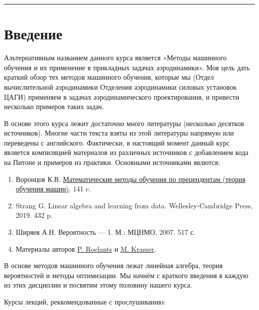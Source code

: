 \documentclass[11pt,a4paper]{article}
\renewcommand{\linethickness}{0.1ex}
\providecommand{\tightlist}{%
      \setlength{\itemsep}{0pt}\setlength{\parskip}{0pt}}
\begin{document}
    \begin{center}\rule{0.5\linewidth}{\linethickness}\end{center}

    \hypertarget{ux432ux432ux435ux434ux435ux43dux438ux435}{%
\section{Введение}\label{ux432ux432ux435ux434ux435ux43dux438ux435}}

Альтернативным названием данного курса является «Методы машинного
обучения и их применение в прикладных задачах аэродинамики». Моя цель
дать краткий обзор тех методов машинного обучения, которые мы (Отдел
вычислительной аэродинамики Отделения аэродинамики силовых установок
ЦАГИ) применяем в задачах аэродинамического проектирования, и привести
несколько примеров таких задач.

В основе этого курса лежит достаточно много литературы (несколько
десятков источников). Многие части текста взяты из этой литературы
напрямую или переведены с английского. Фактически, в настоящий момент
данный курс является компиляцией материалов из различных источников с
добавлением кода на Питоне и примеров из практики. Основными источниками
явлются:

\begin{enumerate}
\def\labelenumi{\arabic{enumi}.}
\tightlist
\item
  Воронцов К.В.
  \href{http://www.machinelearning.ru/wiki/images/6/6d/Voron-ML-1.pdf}{Математические
  методы обучения по прецендентам (теория обучения машин)}. 141 c.
\item
  Strang G. Linear algebra and learning from data. Wellesley-Cambridge
  Press, 2019. 432 p.
\item
  Ширяев А.Н. Вероятность --- 1. М.: МЦНМО, 2007. 517 с.
\item
  Материалы авторов \href{https://peterroelants.github.io/}{P. Roelants}
  и \href{http://krasserm.github.io/}{M. Krasser}.
\end{enumerate}

В основе методов машинного обучения лежат линейная алгебра, теория
вероятностей и методы оптимизации. Мы начнём с краткого введения в
каждую из этих дисциплин и посвятим этому половину нашего курса.

Курсы лекций, реккомендованные с прослушиванию:
\end{document}
